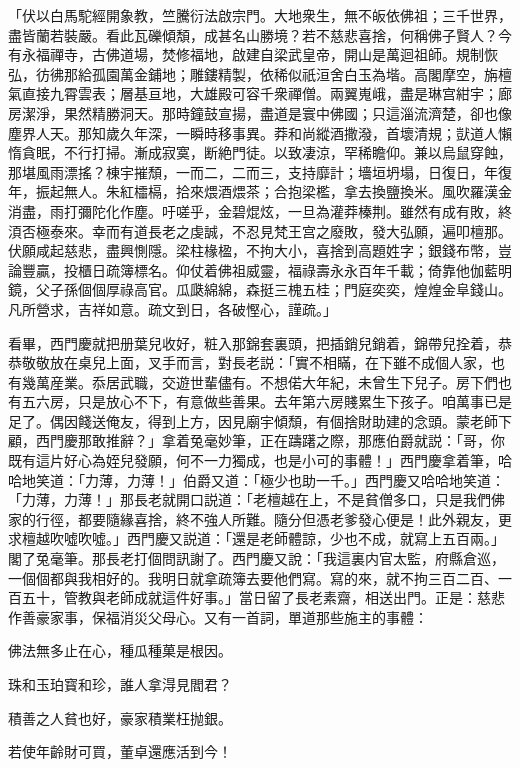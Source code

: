 \begin{myquote}
「伏以白馬駝經開象教，竺騰衍法啟宗門。大地衆生，無不皈依佛祖；三千世界，盡皆蘭若裝嚴。看此瓦礫傾頽，成甚名山勝境？若不慈悲喜捨，何稱佛子賢人？今有永福禪寺，古佛道場，焚修福地，啟建自梁武皇帝，開山是萬迴祖師。規制恢弘，彷彿那給孤園萬金鋪地；雕鏤精製，依稀似祇洹舍白玉為堦。高閣摩空，旃檀氣直接九霄雲表；層基亘地，大雄殿可容千衆禪僧。兩翼嵬峨，盡是琳宫紺宇；廊房潔淨，果然精勝洞天。那時鐘鼓宣揚，盡道是寰中佛國；只這淄流濟楚，卻也像塵界人天。那知歲久年深，一瞬時移事異。莽和尚縱酒撒潑，首壞清規；獃道人懶惰貪眠，不行打掃。漸成寂寞，断絶門徒。以致凄涼，罕稀瞻仰。兼以烏鼠穿蝕，那堪風雨漂搖？棟宇摧頹，一而二，二而三，支持靡計；墻垣坍塌，日復日，年復年，振起無人。朱紅櫺槅，拾來煨酒煨茶；合抱梁檻，拿去換鹽換米。風吹羅漢金消盡，雨打彌陀化作塵。吁嗟乎，金碧焜炫，一旦為灌莽榛荆。雖然有成有敗，終湏否極泰來。幸而有道長老之虔誠，不忍見梵王宫之廢敗，發大弘願，遍叩檀那。伏願咸起慈悲，盡興惻隱。梁柱椽楹，不拘大小，喜捨到高題姓字；銀錢布幣，豈論豐贏，投櫃日疏簿標名。仰仗着佛祖威靈，福祿壽永永百年千載；倚靠他伽藍明鏡，父子孫個個厚祿高官。瓜瓞綿綿，森挺三槐五桂；門庭奕奕，煌煌金阜錢山。凡所營求，吉祥如意。疏文到日，各破慳心，謹疏。」
\end{myquote}

看畢，西門慶就把册葉兒收好，粧入那錦套裏頭，把插銷兒銷着，錦帶兒拴着，恭恭敬敬放在桌兒上面，叉手而言，對長老説：「實不相瞞，在下雖不成個人家，也有幾萬産業。忝居武職，交遊世輩儘有。不想偌大年紀，未曾生下兒子。房下們也有五六房，只是放心不下，有意做些善果。去年第六房賤累生下孩子。咱萬事已是足了。偶因餞送俺友，得到上方，因見廟宇傾頹，有個捨財助建的念頭。蒙老師下顧，西門慶那敢推辭？」拿着兔毫妙筆，正在躊躇之際，那應伯爵就説：「哥，你既有這片好心為姪兒發願，何不一力獨成，也是小可的事體！」西門慶拿着筆，哈哈地笑道：「力薄，力薄！」伯爵又道：「極少也助一千。」西門慶又哈哈地笑道：「力薄，力薄！」那長老就開口説道：「老檀越在上，不是貧僧多口，只是我們佛家的行徑，都要隨緣喜捨，終不強人所難。隨分但憑老爹發心便是！此外親友，更求檀越吹噓吹噓。」西門慶又説道：「還是老師體諒，少也不成，就寫上五百兩。」閣了兔毫筆。那長老打個問訊謝了。西門慶又說：「我這裏内官太監，府縣倉巡，一個個都與我相好的。我明日就拿疏簿去要他們寫。寫的來，就不拘三百二百、一百五十，管教與老師成就這件好事。」當日留了長老素齋，相送出門。正是：慈悲作善豪家事，保福消災父母心。又有一首詞，單道那些施主的事體：

\begin{myquote}
佛法無多止在心，種瓜種菓是根因。

珠和玉珀寳和珍，誰人拿淂見閻君？

積善之人貧也好，豪家積業枉抛銀。

若使年齡財可買，董卓還應活到今！
\end{myquote}

